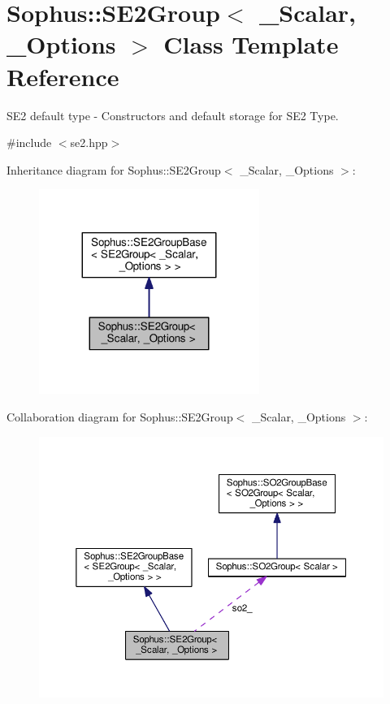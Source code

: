 \hypertarget{class_sophus_1_1_s_e2_group}{}\section{Sophus\+:\+:S\+E2\+Group$<$ \+\_\+\+Scalar, \+\_\+\+Options $>$ Class Template Reference}
\label{class_sophus_1_1_s_e2_group}


S\+E2 default type -\/ Constructors and default storage for S\+E2 Type.  




{\ttfamily \#include $<$se2.\+hpp$>$}



Inheritance diagram for Sophus\+:\+:S\+E2\+Group$<$ \+\_\+\+Scalar, \+\_\+\+Options $>$\+:
\nopagebreak
\begin{figure}[H]
\begin{center}
\leavevmode
\includegraphics[width=203pt]{class_sophus_1_1_s_e2_group__inherit__graph}
\end{center}
\end{figure}


Collaboration diagram for Sophus\+:\+:S\+E2\+Group$<$ \+\_\+\+Scalar, \+\_\+\+Options $>$\+:
\nopagebreak
\begin{figure}[H]
\begin{center}
\leavevmode
\includegraphics[width=350pt]{class_sophus_1_1_s_e2_group__coll__graph}
\end{center}
\end{figure}
